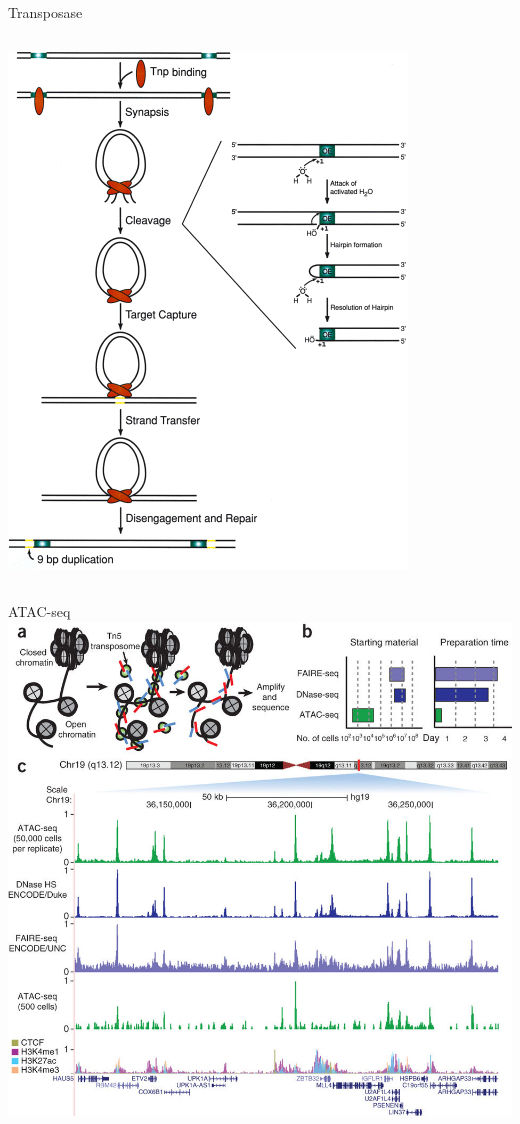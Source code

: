 \documentclass{beamer}
\begin{document}
\begin{frame}{Transposase}
\begin{columns}
\includegraphics[width=.8\linewidth]{reznikoff_2003_tn5.png}
\end{columns}
\end{frame}

\begin{frame}{ATAC-seq}
\includegraphics[width=\linewidth,trim={0 24cm 0 0},clip]{buenrostro_2013_atac.jpg}
\end{frame}
\end{document}
